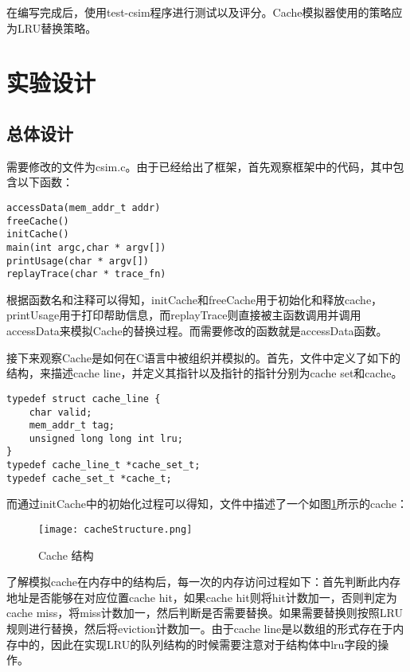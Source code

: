 \par 在编写完成后，使用test-csim程序进行测试以及评分。Cache模拟器使用的策略应为LRU替换策略。

\section{实验设计}
\label{sec:shi_yan_she_ji_}

\subsection{总体设计}
\label{sub:zong_ti_she_ji_}

\par 需要修改的文件为csim.c。由于已经给出了框架，首先观察框架中的代码，其中包含以下函数：
\begin{lstlisting}
accessData(mem_addr_t addr)
freeCache()
initCache()
main(int argc,char * argv[])
printUsage(char * argv[])
replayTrace(char * trace_fn)
\end{lstlisting}

\par 根据函数名和注释可以得知，initCache和freeCache用于初始化和释放cache，printUsage用于打印帮助信息，而replayTrace则直接被主函数调用并调用accessData来模拟Cache的替换过程。而需要修改的函数就是accessData函数。

\par 接下来观察Cache是如何在C语言中被组织并模拟的。首先，文件中定义了如下的结构，来描述cache line，并定义其指针以及指针的指针分别为cache set和cache。
\begin{lstlisting}
typedef struct cache_line {
    char valid;
    mem_addr_t tag;
    unsigned long long int lru;
}
typedef cache_line_t *cache_set_t;
typedef cache_set_t *cache_t;
\end{lstlisting}

\par 而通过initCache中的初始化过程可以得知，文件中描述了一个如图\ref{fig:cacheStructure}所示的cache：

\begin{figure}[htb]
    \centering
    \texttt{[image: cacheStructure.png]}
    \caption{Cache 结构}
    \label{fig:cacheStructure}
\end{figure}
\FloatBarrier

\par 了解模拟cache在内存中的结构后，每一次的内存访问过程如下：首先判断此内存地址是否能够在对应位置cache hit，如果cache hit则将hit计数加一，否则判定为cache miss，将miss计数加一，然后判断是否需要替换。如果需要替换则按照LRU规则进行替换，然后将eviction计数加一。由于cache line是以数组的形式存在于内存中的，因此在实现LRU的队列结构的时候需要注意对于结构体中lru字段的操作。

